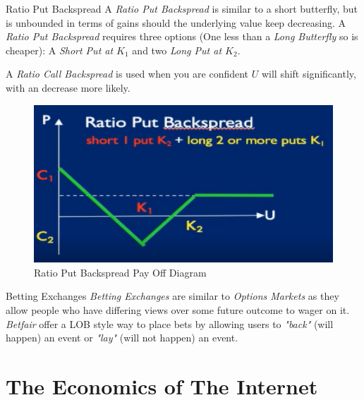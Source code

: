 \documentclass[11pt,a4paper]{article}
\begin{document}
  \begin{definition}{Ratio Put Backspread}
    A \textit{Ratio Put Backspread} is similar to a short butterfly, but is unbounded in terms of gains should the underlying value keep decreasing. A \textit{Ratio Put Backspread} requires three options (One less than a \textit{Long Butterfly} so is cheaper):  A \textit{Short Put at $K_1$} and two \textit{Long Put at $K_2$}.
    \par A \textit{Ratio Call Backspread} is used when you are confident $U$ will shift significantly, with an decrease more likely.
  \end{definition}

  \begin{figure}[ht!]
    \centering
    \includegraphics[width=.5\textwidth]{ratioPutBackspread.PNG}
    \caption{Ratio Put Backspread Pay Off Diagram}
  \end{figure}


  \begin{proposition}{Betting Exchanges}
    \textit{Betting Exchanges} are similar to \textit{Options Markets} as they allow people who have differing views over some future outcome to wager on it. \textit{Betfair} offer a LOB style way to place bets by allowing users to \textit{"back"} (will happen) an event or \textit{"lay"} (will not happen) an event.
  \end{proposition}

\section{The Economics of The Internet}
\end{document}
